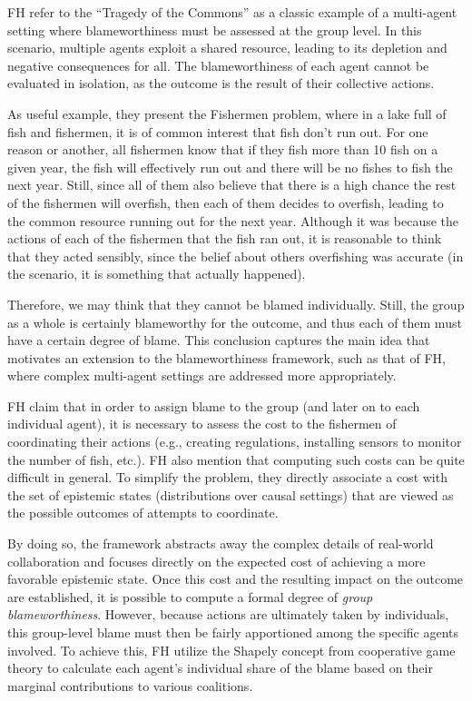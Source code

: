 \documentclass{article}
\begin{document}
FH refer to the ``Tragedy of the Commons'' \cite{hardin_tragedy_1968} as a classic example of a multi-agent setting where blameworthiness must be assessed at the group level. In this scenario, multiple agents exploit a shared resource, leading to its depletion and negative consequences for all. The blameworthiness of each agent cannot be evaluated in isolation, as the outcome is the result of their collective actions.

As useful example, they present the Fishermen problem, where in a lake full of fish and fishermen, it is of common interest that fish don't run out. For one reason or another, all fishermen know that if they fish more than 10 fish on a given year, the fish will effectively run out and there will be no fishes to fish the next year. Still, since all of them also believe that there is a high chance the rest of the fishermen will overfish, then each of them decides to overfish, leading to the common resource running out for the next year. Although it was because the actions of each of the fishermen that the fish ran out, it is reasonable to think that they acted sensibly, since the belief about others overfishing was accurate (in the scenario, it is something that actually happened). 

Therefore, we may think that they cannot be blamed individually. Still, the group as a whole is certainly blameworthy for the outcome, and thus each of them must have a certain degree of blame. This conclusion captures the main idea that motivates an extension to the blameworthiness framework, such as that of FH, where complex multi-agent settings are addressed more appropriately.

FH claim that in order to assign blame to the group (and later on to each individual agent), it is necessary to assess the cost to the fishermen of coordinating their actions (e.g., creating regulations, installing sensors to monitor the number of fish, etc.). FH also mention that computing such costs can be quite difficult in general. To simplify the problem, they directly associate a cost with the set of epistemic states (distributions over causal settings) that are viewed as the possible outcomes of attempts to coordinate. 

By doing so, the framework abstracts away the complex details of real-world collaboration and focuses directly on the expected cost of achieving a more favorable epistemic state. Once this cost and the resulting impact on the outcome are established, it is possible to compute a formal degree of \textit{group blameworthiness}. However, because actions are ultimately taken by individuals, this group-level blame must then be fairly apportioned among the specific agents involved. To achieve this, FH utilize the Shapely \cite{shapley_value_nodate} concept from cooperative game theory to calculate each agent's individual share of the blame based on their marginal contributions to various coalitions. 
\end{document}
